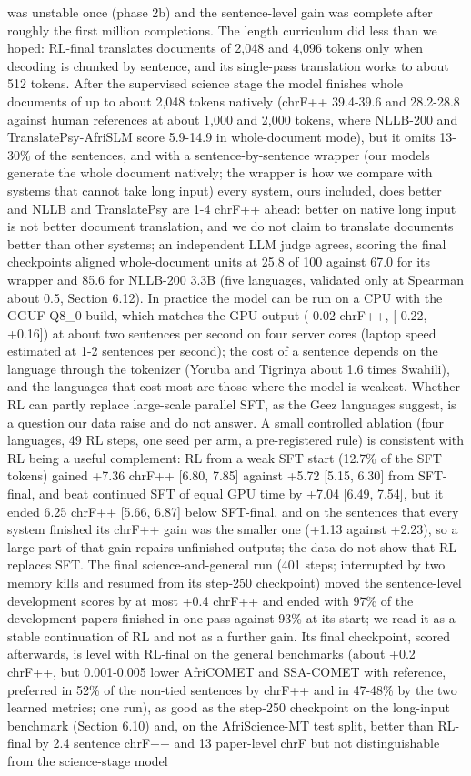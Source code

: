 was unstable once (phase 2b) and the sentence-level gain was complete after roughly the first million completions. The length curriculum did less than we hoped: RL-final translates documents of 2,048 and 4,096 tokens only when decoding is chunked by sentence, and its single-pass translation works to about 512 tokens. After the supervised science stage the model finishes whole documents of up to about 2,048 tokens natively (chrF++ 39.4-39.6 and 28.2-28.8 against human references at about 1,000 and 2,000 tokens, where NLLB-200 and TranslatePsy-AfriSLM score 5.9-14.9 in whole-document mode), but it omits 13-30\% of the sentences, and with a sentence-by-sentence wrapper (our models generate the whole document natively; the wrapper is how we compare with systems that cannot take long input) every system, ours included, does better and NLLB and TranslatePsy are 1-4 chrF++ ahead: better on native long input is not better document translation, and we do not claim to translate documents better than other systems; an independent LLM judge agrees, scoring the final checkpoint\textquotesingle s aligned whole-document units at 25.8 of 100 against 67.0 for its wrapper and 85.6 for NLLB-200 3.3B (five languages, validated only at Spearman about 0.5, Section 6.12). In practice the model can be run on a CPU with the GGUF Q8\_0 build, which matches the GPU output (-0.02 chrF++, {[}-0.22, +0.16{]}) at about two sentences per second on four server cores (laptop speed estimated at 1-2 sentences per second); the cost of a sentence depends on the language through the tokenizer (Yoruba and Tigrinya about 1.6 times Swahili), and the languages that cost most are those where the model is weakest. Whether RL can partly replace large-scale parallel SFT, as the Ge\textquotesingle ez languages suggest, is a question our data raise and do not answer. A small controlled ablation (four languages, 49 RL steps, one seed per arm, a pre-registered rule) is consistent with RL being a useful complement: RL from a weak SFT start (12.7\% of the SFT tokens) gained +7.36 chrF++ {[}6.80, 7.85{]} against +5.72 {[}5.15, 6.30{]} from SFT-final, and beat continued SFT of equal GPU time by +7.04 {[}6.49, 7.54{]}, but it ended 6.25 chrF++ {[}5.66, 6.87{]} below SFT-final, and on the sentences that every system finished its chrF++ gain was the smaller one (+1.13 against +2.23), so a large part of that gain repairs unfinished outputs; the data do not show that RL replaces SFT. The final science-and-general run (401 steps; interrupted by two memory kills and resumed from its step-250 checkpoint) moved the sentence-level development scores by at most +0.4 chrF++ and ended with 97\% of the development papers finished in one pass against 93\% at its start; we read it as a stable continuation of RL and not as a further gain. Its final checkpoint, scored afterwards, is level with RL-final on the general benchmarks (about +0.2 chrF++, but 0.001-0.005 lower AfriCOMET and SSA-COMET with reference, preferred in 52\% of the non-tied sentences by chrF++ and in 47-48\% by the two learned metrics; one run), as good as the step-250 checkpoint on the long-input benchmark (Section 6.10) and, on the AfriScience-MT test split, better than RL-final by 2.4 sentence chrF++ and 13 paper-level chrF but not distinguishable from the science-stage model 